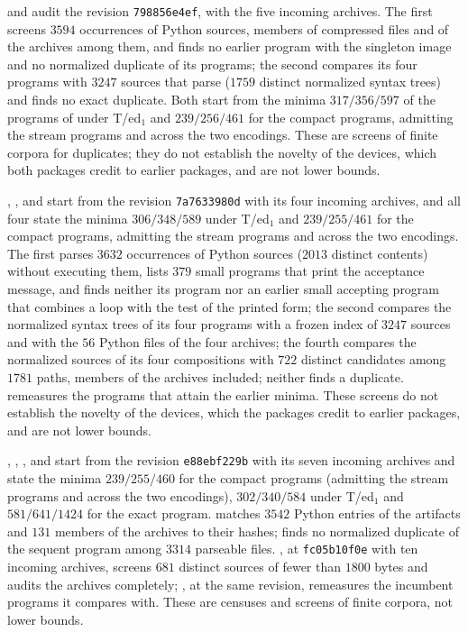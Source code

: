  and  audit the revision
\texttt{798856e4ef}, with the five incoming archives. The first screens $3594$
occurrences of Python sources, members of compressed files and of the archives among
them, and finds no earlier program with the singleton image and no normalized
duplicate of its programs; the second compares its four programs with $3247$ sources
that parse ($1759$ distinct normalized syntax trees) and finds no exact duplicate.
Both start from the minima $317/356/597$ of the programs of
 under T/ed$_1$ and $239/256/461$ for the compact
programs, admitting the stream programs and across the two encodings. These are
screens of finite corpora for duplicates; they do not establish the novelty of the
devices, which both packages credit to earlier packages, and are not lower bounds.

, ,  and
 start from the revision \texttt{7a7633980d} with
its four incoming archives, and all four state the minima $306/348/589$ under
T/ed$_1$ and $239/255/461$ for the compact programs, admitting the stream programs and
across the two encodings. The first parses $3632$ occurrences of Python sources
($2013$ distinct contents) without executing them, lists $379$ small programs that
print the acceptance message, and finds neither its program nor an earlier small
accepting program that combines a loop with the test of the printed form; the second
compares the normalized syntax trees of its four programs with a frozen index of
$3247$ sources and with the $56$ Python files of the four archives; the fourth
compares the normalized sources of its four compositions with $722$ distinct
candidates among $1781$ paths, members of the archives included; neither finds a
duplicate.  remeasures the programs that attain the earlier minima.
These screens do not establish the novelty of the devices, which the packages credit
to earlier packages, and are not lower bounds.

, , ,
 and  start from the revision
\texttt{e88ebf229b} with its seven incoming archives and state the minima
$239/255/460$ for the compact programs (admitting the stream programs and across the two
encodings), $302/340/584$ under T/ed$_1$ and $581/641/1424$ for the exact program.
 matches $3542$ Python entries of the artifacts and $131$ members of the
archives to their hashes;  finds no normalized duplicate of
the sequent program among $3314$ parseable files. , at
\texttt{fc05b10f0e} with ten incoming archives, screens $681$ distinct sources of fewer
than $1800$ bytes and audits the archives completely; , at the same
revision, remeasures the incumbent programs it compares with. These are censuses and screens of
finite corpora, not lower bounds.

